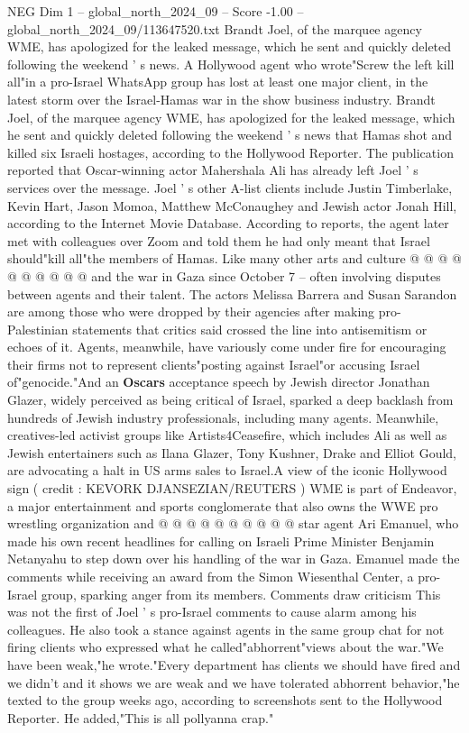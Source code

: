 \begin{textsample}{NEG Dim 1 – global\_north\_2024\_09 – Score -1.00 – global\_north\_2024\_09/113647520.txt}  \label{ex:f1_neg_357}
Brandt Joel, of the marquee agency WME, has apologized for the leaked message, which he sent and quickly deleted following the weekend ' s news.
A Hollywood agent who wrote"Screw the left kill all"in a pro-Israel WhatsApp group has lost at least one major client, in the latest storm over the Israel-Hamas war in the show business industry.
Brandt Joel, of the marquee agency WME, has apologized for the leaked message, which he sent and quickly deleted following the weekend ' s news that Hamas shot and killed six Israeli hostages, according to the Hollywood Reporter.
The publication reported that Oscar-winning actor Mahershala Ali has already left Joel ' s services over the message.
Joel ' s other A-list clients include Justin Timberlake, Kevin Hart, Jason Momoa, Matthew McConaughey and Jewish actor Jonah Hill, according to the Internet Movie Database.
According to reports, the agent later met with colleagues over Zoom and told them he had only meant that Israel should"kill all"the members of Hamas.
Like many other arts and culture @ @ @ @ @ @ @ @ @ @ and the war in Gaza since October 7 -- often involving disputes between agents and their talent.
The actors Melissa Barrera and Susan Sarandon are among those who were dropped by their agencies after making pro-Palestinian statements that critics said crossed the line into antisemitism or echoes of it.
Agents, meanwhile, have variously come under fire for encouraging their firms not to represent clients"posting against Israel"or accusing Israel of"genocide."And an \textbf{Oscars} acceptance speech by Jewish director Jonathan Glazer, widely perceived as being critical of Israel, sparked a deep backlash from hundreds of Jewish industry professionals, including many agents.
Meanwhile, creatives-led activist groups like Artists4Ceasefire, which includes Ali as well as Jewish entertainers such as Ilana Glazer, Tony Kushner, Drake and Elliot Gould, are advocating a halt in US arms sales to Israel.A view of the iconic Hollywood sign ( credit : KEVORK DJANSEZIAN/REUTERS ) WME is part of Endeavor, a major entertainment and sports conglomerate that also owns the WWE pro wrestling organization and @ @ @ @ @ @ @ @ @ @ star agent Ari Emanuel, who made his own recent headlines for calling on Israeli Prime Minister Benjamin Netanyahu to step down over his handling of the war in Gaza.
Emanuel made the comments while receiving an award from the Simon Wiesenthal Center, a pro-Israel group, sparking anger from its members.
Comments draw criticism This was not the first of Joel ' s pro-Israel comments to cause alarm among his colleagues.
He also took a stance against agents in the same group chat for not firing clients who expressed what he called"abhorrent"views about the war."We have been weak,"he wrote."Every department has clients we should have fired and we didn't and it shows we are weak and we have tolerated abhorrent behavior,"he texted to the group weeks ago, according to screenshots sent to the Hollywood Reporter.
He added,"This is all pollyanna crap."

\end{textsample}
